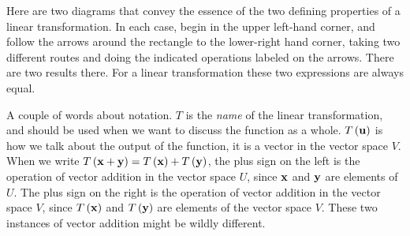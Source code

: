 \documentclass{ximera}
\begin{document}
Here are two diagrams that convey the essence of the two defining
properties of a linear transformation.  In each case, begin in the
upper left-hand corner, and follow the arrows around the rectangle to
the lower-right hand corner, taking two different routes and doing the
indicated operations labeled on the arrows.  There are two results
there.  For a linear transformation these two expressions are always
equal.
\begin{image}
\end{image}
\begin{image}
\end{image}

A couple of words about notation.  $T$ is the \textit{name} of the
linear transformation, and should be used when we want to discuss the
function as a whole.  $T\left(\mathbf{u}\right)$ is how we talk about the
output of the function, it is a vector in the vector space $V$.  When
we write
$T\left(\mathbf{x}+\mathbf{y}\right)=T\left(\mathbf{x}\right)+T\left(\mathbf{y}\right)$, the
plus sign on the left is the operation of vector addition in the
vector space $U$, since $\mathbf{x}$ and $\mathbf{y}$ are elements of $U$.
The plus sign on the right is the operation of vector addition in the
vector space $V$, since $T\left(\mathbf{x}\right)$ and $T\left(\mathbf{y}\right)$ are
elements of the vector space $V$.  These two instances of vector
addition might be wildly different.
\end{document}
